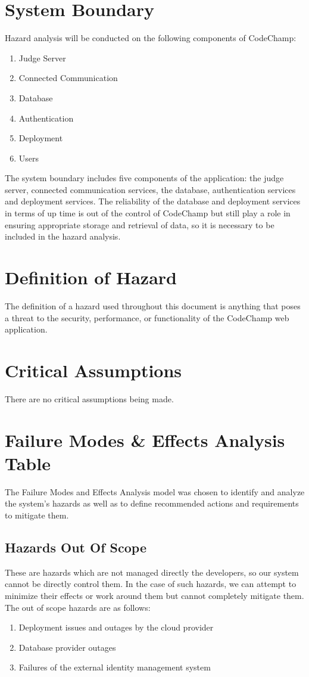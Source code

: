 \documentclass{article}
\begin{document}
\section{System Boundary}
Hazard analysis will be conducted on the following components of CodeChamp:
\begin{enumerate}
  \item Judge Server
  \item Connected Communication
  \item Database
  \item Authentication
  \item Deployment
  \item Users
\end{enumerate}

The system boundary includes five components of the application: the judge server, connected communication services, the database, authentication services and deployment services. The reliability of the database and deployment services in terms of up time is out of the control of CodeChamp but still play a role in ensuring appropriate storage and retrieval of data, so it is necessary to be included in the hazard analysis.


\section{Definition of Hazard}

The definition of a hazard used throughout this document is anything that poses a threat to the security, performance, or functionality of the CodeChamp web application.

\section{Critical Assumptions}
There are no critical assumptions being made.

\section{Failure Modes \& Effects Analysis Table}
The Failure Modes and Effects Analysis model was chosen to identify and analyze the system's hazards as well as to define recommended actions and requirements to mitigate them.

\subsection{Hazards Out Of Scope}
These are hazards which are not managed directly the developers, so our system cannot be directly control them. In the case of such hazards, we can attempt to minimize their effects or work around them but cannot completely mitigate them. The out of scope hazards are as follows: 
\begin{enumerate}
    \item Deployment issues and outages by the cloud provider
    \item Database provider outages
    \item Failures of the external identity management system
\end{enumerate}
\end{document}
